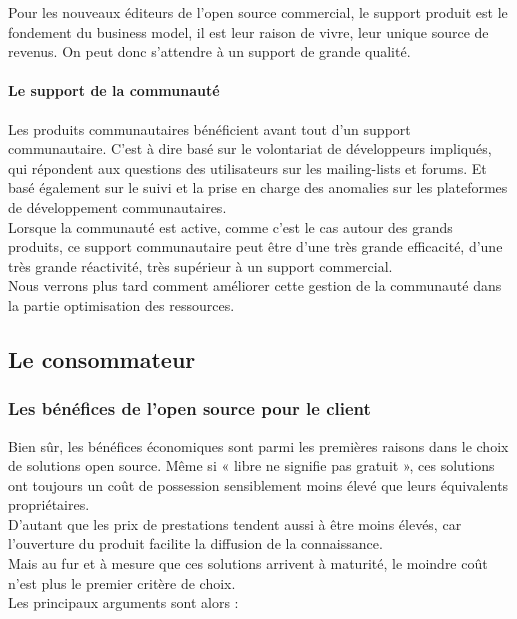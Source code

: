 				Pour les nouveaux éditeurs de l'open source commercial, le support produit est le fondement du business model, il est leur raison de vivre, leur unique source de revenus. On peut donc s'attendre à un support de grande qualité.

				\paragraph{Le support de la communauté\\}

				Les produits communautaires bénéficient avant tout d'un support communautaire. C'est à dire basé sur le volontariat de développeurs impliqués, qui répondent aux questions des utilisateurs sur les mailing-lists et forums. Et basé également sur le suivi et la prise en charge des anomalies sur les plateformes de développement communautaires.\\

				Lorsque la communauté est active, comme c'est le cas autour des grands produits, ce support communautaire peut être d'une très grande efficacité, d'une très grande réactivité, très supérieur à un support commercial.\\

				Nous verrons plus tard comment améliorer cette gestion de la communauté dans la partie optimisation des ressources.

		\subsection{Le consommateur}

			\subsubsection{Les bénéfices de l'open source pour le client}

			Bien sûr, les bénéfices économiques sont parmi les premières raisons dans le choix de solutions open source. Même si « libre ne signifie pas gratuit », ces solutions ont toujours un coût de possession sensiblement moins élevé que leurs équivalents propriétaires.\\

			D'autant que les prix de prestations tendent aussi à être moins élevés, car l'ouverture du produit facilite la diffusion de la connaissance.\\

			Mais au fur et à mesure que ces solutions arrivent à maturité, le moindre coût n'est plus le premier critère de choix.\\
			Les principaux arguments sont alors :\\



